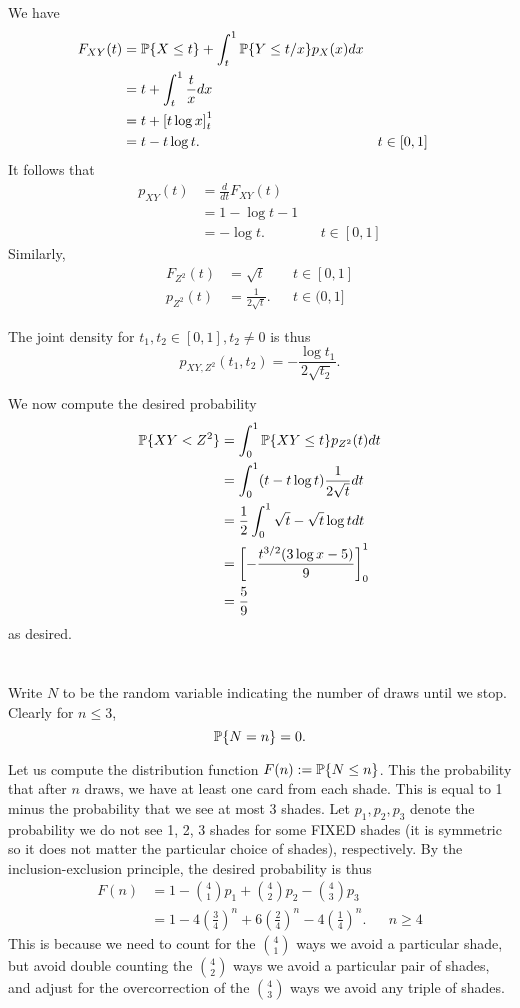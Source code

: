 \documentclass[10pt]{article}
\DeclarePairedDelimiter{\set}{\lbrace}{\rbrace}
\renewcommand{\P}{\mathbb{P}}
\begin{document}
We have
\begin{align*}
  F_{XY}(t)
  &= \P\set{X\leq t} + \int_t^1 \P\set{Y\leq t/x} p_X(x) dx \\
  &= t + \int_t^1 \frac{t}{x} dx \\
  &= t + \left[ t\log x \right]_t^1 \\
  &= t - t\log t. &&t\in [0, 1]
\end{align*}
It follows that
\begin{align*}
  p_{XY}(t)
  &= \frac{d}{dt} F_{XY}(t) \\
  &= 1 - \log t - 1 \\
  &= -\log t. &&t\in [0, 1]
\end{align*}
Similarly,
\begin{align*}
  F_{Z^2}(t) &= \sqrt t &&t\in [0, 1] \\
  p_{Z^2}(t) &= \frac1{2\sqrt t}. &&t\in (0, 1]
\end{align*}

The joint density for $t_1, t_2\in [0, 1], t_2\neq 0$ is thus
\[
  \boxed{p_{XY, Z^2}(t_1, t_2) = - \frac{\log t_1}{2\sqrt{t_2}}}.
\]

We now compute the desired probability
\begin{align*}
  \P\set{XY < Z^2}
  &= \int_0^1 \P\set{XY\leq t} p_{Z^2} (t) dt \\
  &= \int_0^1 (t- t\log t) \frac1{2\sqrt t} dt \\
  &= \frac12 \int_0^1 \sqrt t - \sqrt t \log t dt \\
  &= \left[ - \frac{t^{3/2} (3\log x - 5)}9 \right]_0^1 \\
  &= \frac59
\end{align*}
as desired.

\clearpage
\section{}
\subsection{}
Write $N$ to be the random variable indicating the number of draws until we stop.
Clearly for $n\leq 3$,
\[
  \P\set{N=n} = 0.
\]

Let us compute the distribution function $F(n) := \P\set{N\leq n}$.
This the probability that after $n$ draws,
we have at least one card from each shade.
This is equal to 1 minus the probability that we see at most 3 shades.
Let $p_1, p_2, p_3$ denote the probability we do not see 1, 2, 3 shades for some FIXED shades
(it is symmetric so it does not matter the particular choice of shades),
respectively.
By the inclusion-exclusion principle,
the desired probability is thus
\begin{align*}
  F(n)
  &= 1 - \binom41 p_1 + \binom42 p_2 - \binom43 p_3 \\
  &= 1- 4 \left( \frac34 \right)^n + 6 \left( \frac24 \right)^n - 4 \left( \frac14 \right)^n. &&n\geq 4
\end{align*}
This is because we need to count for the $\binom41$ ways we avoid a particular shade,
but avoid double counting the $\binom42$ ways we avoid a particular pair of shades,
and adjust for the overcorrection of the $\binom43$ ways we avoid any triple of shades.
\end{document}

